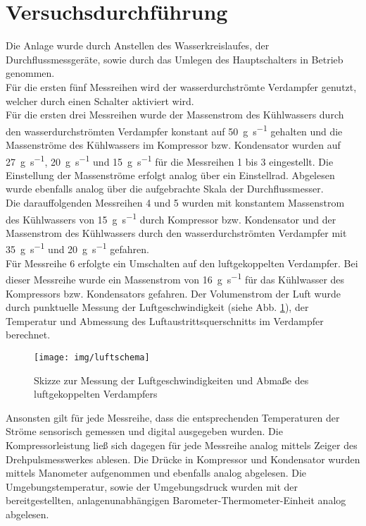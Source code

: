 \section{Versuchsdurchführung}
\label{sec:durchfuerung}
Die Anlage wurde durch Anstellen des Wasserkreislaufes, der Durchflussmessgeräte, sowie durch das Umlegen des Hauptschalters in Betrieb genommen.\\
Für die ersten fünf Messreihen wird der wasserdurchströmte Verdampfer genutzt, welcher durch einen Schalter aktiviert wird. \\
Für die ersten drei Messreihen wurde der Massenstrom des Kühlwassers durch den  wasserdurchströmten Verdampfer konstant auf \SI{50}{\gram \per \second} gehalten und die Massenströme des Kühlwassers im Kompressor bzw. Kondensator wurden auf \SI{27}{\gram \per \second}, \SI{20}{\gram \per \second} und \SI{15}{\gram \per \second} für die Messreihen 1 bis 3 eingestellt. Die Einstellung der Massenströme erfolgt analog über ein Einstellrad. Abgelesen wurde ebenfalls analog über die aufgebrachte Skala der Durchflussmesser.\\
Die darauffolgenden Messreihen 4 und 5 wurden mit konstantem Massenstrom des Kühlwassers von \SI{15}{\gram \per \second} durch Kompressor bzw. Kondensator und der Massenstrom des Kühlwassers durch den  wasserdurchströmten Verdampfer mit \SI{35}{\gram \per \second} und \SI{20}{\gram \per \second} gefahren.\\
\newpage
Für Messreihe 6 erfolgte ein Umschalten auf den luftgekoppelten Verdampfer. Bei dieser Messreihe wurde ein Massenstrom von \SI{16}{\gram \per \second} für das Kühlwasser des Kompressors bzw. Kondensators gefahren. Der Volumenstrom der Luft wurde durch punktuelle Messung der Luftgeschwindigkeit (siehe Abb. \ref{fig:luftschema}), der Temperatur und Abmessung des Luftaustrittsquerschnitts im Verdampfer berechnet.

\begin{figure}[h!]
	\centering
	\texttt{[image: img/luftschema]}
	\caption{Skizze zur Messung der Luftgeschwindigkeiten und Abmaße des \mbox{luftgekoppelten} Verdampfers}
	\label{fig:luftschema}
\end{figure}
\FloatBarrier

Ansonsten gilt für jede Messreihe, dass die entsprechenden Temperaturen der Ströme sensorisch gemessen und digital ausgegeben wurden. Die Kompressorleistung ließ sich dagegen für jede Messreihe analog mittels Zeiger des Drehpulsmesswerkes ablesen. Die Drücke in Kompressor und Kondensator wurden mittels Manometer aufgenommen und ebenfalls analog abgelesen.
Die Umgebungstemperatur, sowie der Umgebungsdruck wurden mit der bereitgestellten, anlagenunabhängigen  Barometer-Thermometer-Einheit analog abgelesen. 
